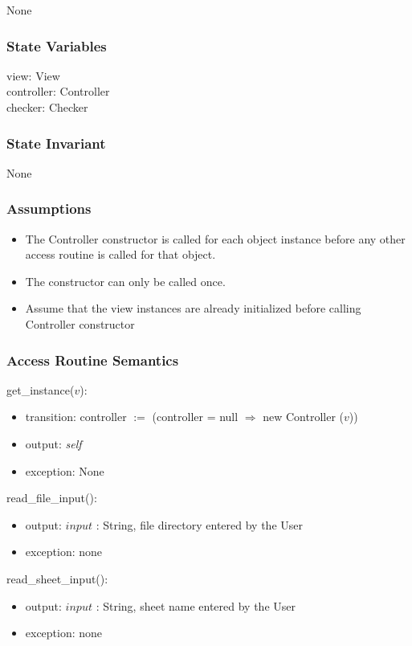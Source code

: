 \documentclass[12pt]{article}
\begin{document}
None

\subsubsection* {State Variables}

view: View \\
controller: Controller\\
checker: Checker

\subsubsection* {State Invariant}

None

\subsubsection* {Assumptions}

\begin{itemize}
  \item The Controller constructor is called for each object instance before any
  other access routine is called for that object.  
  \item The constructor can only be called once.
  \item Assume that the view instances are already initialized before calling 
  Controller constructor
\end{itemize}

\subsubsection* {Access Routine Semantics}

get\_instance($v$):
\begin{itemize}
  \item transition: controller $:=$ (controller = null $\Rightarrow$ new Controller ($v$))
  \item output: \textit{self}
  \item exception: None
\end{itemize}

\noindent read\_file\_input():
\begin{itemize}
  \item output: $input$ : String, file directory entered by the User
  \item exception: none
\end{itemize}

\noindent read\_sheet\_input():
\begin{itemize}
  \item output: $input$ : String, sheet name entered by the User
  \item exception: none
\end{itemize}
\end{document}
